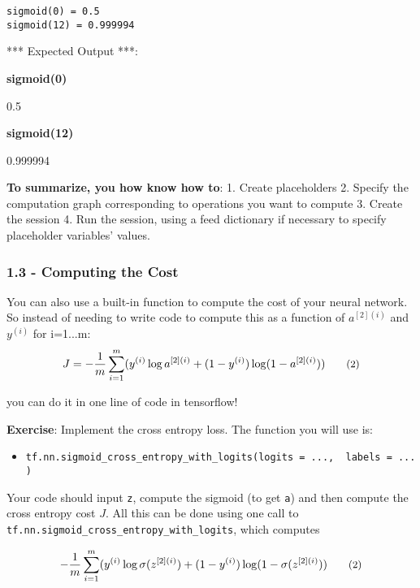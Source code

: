\documentclass[11pt]{article}
\providecommand{\tightlist}{%
      \setlength{\itemsep}{0pt}\setlength{\parskip}{0pt}}
\begin{document}
    \begin{Verbatim}[commandchars=\\\{\}]
sigmoid(0) = 0.5
sigmoid(12) = 0.999994

    \end{Verbatim}

    *** Expected Output ***:

\textbf{sigmoid(0)}

0.5

\textbf{sigmoid(12)}

0.999994

     \textbf{To summarize, you how know how to}: 1. Create placeholders 2.
Specify the computation graph corresponding to operations you want to
compute 3. Create the session 4. Run the session, using a feed
dictionary if necessary to specify placeholder variables' values.

    \subsubsection{1.3 - Computing the Cost}\label{computing-the-cost}

You can also use a built-in function to compute the cost of your neural
network. So instead of needing to write code to compute this as a
function of \(a^{[2](i)}\) and \(y^{(i)}\) for i=1...m:
\[ J = - \frac{1}{m}  \sum_{i = 1}^m  \large ( \small y^{(i)} \log a^{ [2] (i)} + (1-y^{(i)})\log (1-a^{ [2] (i)} )\large )\small\tag{2}\]

you can do it in one line of code in tensorflow!

\textbf{Exercise}: Implement the cross entropy loss. The function you
will use is:

\begin{itemize}
\tightlist
\item
  \texttt{tf.nn.sigmoid\_cross\_entropy\_with\_logits(logits\ =\ ...,\ \ labels\ =\ ...)}
\end{itemize}

Your code should input \texttt{z}, compute the sigmoid (to get
\texttt{a}) and then compute the cross entropy cost \(J\). All this can
be done using one call to
\texttt{tf.nn.sigmoid\_cross\_entropy\_with\_logits}, which computes

\[- \frac{1}{m}  \sum_{i = 1}^m  \large ( \small y^{(i)} \log \sigma(z^{[2](i)}) + (1-y^{(i)})\log (1-\sigma(z^{[2](i)})\large )\small\tag{2}\]
\end{document}
